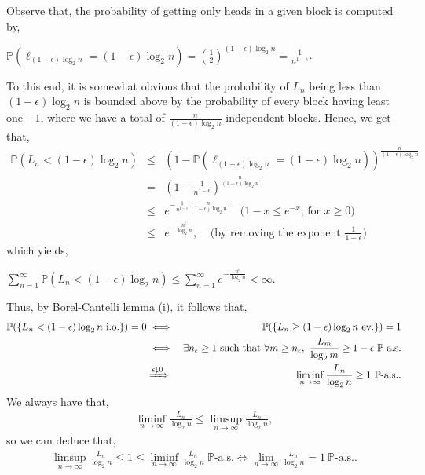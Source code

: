 \documentclass{article}
\begin{document}
Observe that, the probability of getting only heads in a given block is computed by,
\begin{center}
	$\mathbb{P}(\ell_{(1-\epsilon)\log_2{n}} = (1-\epsilon)\log_2{n}) = (\frac{1}{2})^{(1-\epsilon)\log_2{n}} = \frac{1}{n^{1-\epsilon}}$.
\end{center}
To this end, it is somewhat obvious that the probability of $L_n$ being less than $(1-\epsilon)\log_2{n}$ is bounded above by the probability of every block having least one $-1$, where we have a total of $\frac{n}{(1-\epsilon)\log_2{n}}$ independent blocks. Hence, we get that,
\begin{eqnarray}
\nonumber
\mathbb{P}(L_n < (1-\epsilon)\log_2{n}) &\leq& (1 - \mathbb{P}(\ell_{(1-\epsilon)\log_2{n}} = (1-\epsilon)\log_2{n}))^{\frac{n}{(1-\epsilon)\log_2{n}}}\\
\nonumber
&=& \left(1 - \frac{1}{n^{1-\epsilon}}\right)^{\frac{n}{(1-\epsilon)\log_2{n}}}\\
\nonumber
&\leq& e^{-\frac{1}{n^{1-\epsilon}}\frac{n}{(1-\epsilon)\log_2{n}}} \ \ \ \ \ \text{($1-x \leq e^{-x}$, for $x \geq 0$)}\\
\nonumber
&\leq& e^{-\frac{n^\epsilon}{\log_2{n}}}, \ \ \ \ \ \text{(by removing the exponent $\frac{1}{1-\epsilon}$)}
\end{eqnarray}
which yields,
\begin{center}
	$\sum_{n=1}^{\infty}\mathbb{P}(L_n < (1-\epsilon)\log_2{n}) \leq \sum_{n=1}^{\infty}e^{-\frac{n^\epsilon}{\log_2{n}}} < \infty$.
\end{center}
Thus, by Borel-Cantelli lemma (i), it follows that,
\begin{eqnarray}
\nonumber
\mathbb{P}(\{L_n < (1-\epsilon)\log_2{n} \ \text{i.o.}\}) = 0 &\iff& \mathbb{P}(\{L_n \geq (1-\epsilon)\log_2{n} \ \text{ev.}\}) = 1\\
\nonumber
&\iff& \exists n_\epsilon \geq 1 \ \text{such that} \ \forall m \geq n_\epsilon, \ \frac{L_m}{\log_2{m}} \geq 1-\epsilon\ \mathbb{P}\text{-a.s.}\\
\nonumber
&\xRightarrow{\epsilon \downarrow 0}& \liminf_{n\to\infty}\frac{L_n}{\log_2{n}} \geq 1 \ \mathbb{P}\text{-a.s.}.
\end{eqnarray}
We always have that,
\begin{eqnarray}
\nonumber
\liminf_{n\to\infty}\frac{L_n}{\log_2{n}} \leq \limsup_{n\to\infty}\frac{L_n}{\log_2{n}},
\end{eqnarray}
so we can deduce that,
\begin{eqnarray}
\nonumber
\limsup_{n\to\infty}\frac{L_n}{\log_2{n}} \leq 1 \leq \liminf_{n\to\infty}\frac{L_n}{\log_2{n}} \ \mathbb{P}\text{-a.s.}\iff \lim_{n\to\infty}\frac{L_n}{\log_2{n}} = 1 \ \mathbb{P}\text{-a.s.}.
\end{eqnarray}
\end{document}
